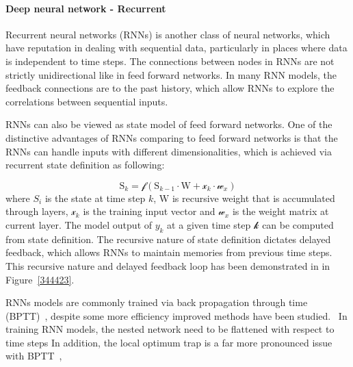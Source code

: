 \paragraph{Deep neural network - Recurrent}
Recurrent neural networks (RNNs) is another class of neural networks, which have reputation in dealing with sequential data, particularly in places where data is independent to time steps. The connections between nodes in RNNs are not strictly unidirectional like in feed forward networks. In many RNN models, the feedback connections are to the past history, which allow RNNs to explore the correlations between sequential inputs.   
\par 
RNNs can also be viewed as state model of feed forward networks. One of the distinctive advantages of RNNs comparing to feed forward networks is that the RNNs can handle inputs with different dimensionalities, which is achieved via recurrent state definition as following:

\begin{equation}
    \mathrm{S}_k = \mathcal{f}(\mathrm{S}_{k-1} \cdot \mathrm{W} + \mathcal{x}_k \cdot \mathcal{w}_x)
\end{equation}
where $S_i$ is the state at time step $k$, $\mathrm{W}$ is recursive weight that is accumulated through layers, $\mathcal{x}_k$ is the training input vector and $\mathcal{w}_x$ is the weight matrix at current layer. The model output of $y_k$ at a given time step $\mathcal{k}$ can be computed from state definition. The recursive nature of state definition dictates delayed feedback, which allows RNNs to maintain memories from previous time steps. This recursive nature and delayed feedback loop has been demonstrated in in Figure~\ref{344423}. 
\par 
RNNs models are commonly trained via back propagation through time (BPTT)~\cite{Goodfellow-et-al-2016}, despite some more efficiency improved methods have been studied.~\cite{963769,neco.1989,Gomez:2008:ANE:1390681.1390712} In training RNN models, the nested network need to be flattened with respect to time steps
In addition, the local optimum trap is a far more pronounced issue with BPTT~\cite{Cu_llar}, 